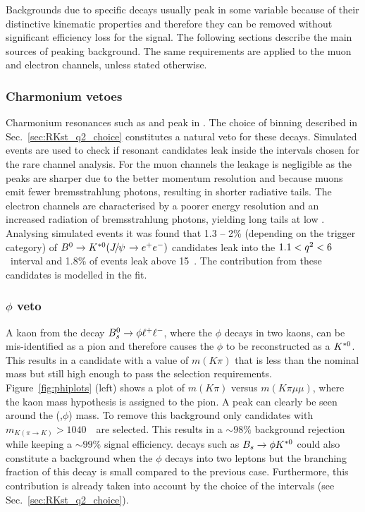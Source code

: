 Backgrounds due to specific decays usually peak in some variable because of their
distinctive kinematic properties and therefore they can be removed without significant
efficiency loss for the signal. The following sections describe the main sources of peaking background.
The same requirements are applied to the muon and electron channels, unless stated otherwise.

\subsubsection{Charmonium vetoes}

Charmonium resonances such as \jpsi and \psitwos peak in \qsq.
The choice of \qsq binning described in Sec.~\ref{sec:RKst_q2_choice}
constitutes a natural veto for these decays. Simulated events are used
to check if resonant candidates leak inside the \qsq intervals chosen for
the rare channel analysis. For the muon channels the leakage is negligible
as the peaks are sharper due to the better momentum resolution and because muons 
emit fewer bremsstrahlung photons, resulting in shorter radiative tails.
The electron channels are characterised by a poorer energy resolution and an increased 
radiation of bremsstrahlung photons, yielding long tails at low \qsq.
Analysing simulated events it was found that 1.3 -- 2\% (depending on
the trigger category) of \mbox{$\Bz\to\Kstarz(\jpsi\to\ee)$} candidates leak into the 
$1.1 < {q^2} < 6$~\gevgevcccc interval and 1.8\% of \psitwos events leak above 
15~\gevgevcccc. The contribution from these candidates is modelled in the fit. 


\subsubsection{$\phi$ veto}

A kaon from the decay ${{B}^0_{s}} \rightarrow \phi \ell^+ \ell^-$, where the $\phi$ decays in two kaons,
can be mis-identified as a pion and therefore causes the $\phi$ to be reconstructed as a ${{K}^{*0}}$. This results in
a candidate with a value of $m(K\pi)$ that is less than the nominal \Kstarz mass but still high enough to
pass the selection requirements. Figure~\ref{fig:phiplots} (left) shows a plot of $m(K\pi)$ versus
$m(K\pi \mu\mu)$, where the kaon mass hypothesis is assigned to the pion. A peak can clearly be seen
around the (\Bs,$\phi$) mass.
To remove this background only candidates with $m_{K(\pi\rightarrow K)} > 1040$~\mevcc~are selected.
This results in a $\sim98\%$ background rejection while keeping a $\sim99\%$ signal efficiency.
\Bs decays such as $B_s \rightarrow \phi {\ensuremath{{K}^{*0}}}$ could also constitute a background when the $\phi$ decays 
into two leptons but the branching fraction of this decay is small compared to the previous case.
Furthermore, this contribution is already taken into account by the choice of the \qsq intervals (see Sec.~\ref{sec:RKst_q2_choice}).

